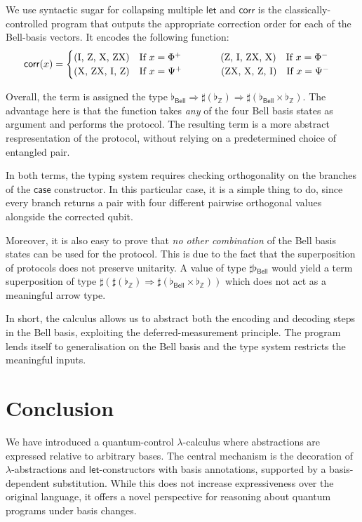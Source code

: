 \documentclass[a4paper,UKenglish,numberwithinsect,pdfa,anonymous]{lipics-v2021}
\theoremstyle{restatestyle}
\def\Arr{\Rightarrow}
\newcommand\B{\mathbb Z}
\newcommand{\Bell}{\mathsf{Bell}}
\newcommand\basis[1]{\ensuremath{\flat_{#1}}}
\begin{document}
We use syntactic sugar for collapsing multiple $\mathsf{let}$ and $\mathsf{corr}$ is
the classically-controlled program that outputs the appropriate correction order for
each of the Bell-basis vectors. It encodes the following function:
\[
\mathsf{corr}(x) = 
\begin{cases}
($I, Z, X, ZX$)\quad \text{If }x=\Phi^+\qquad\qquad
($Z, I, ZX, X$)\quad \text{If }x=\Phi^-\\
($X, ZX, I, Z$)\quad \text{If }x=\Psi^+\qquad\qquad
($ZX, X, Z, I$)\quad \text{If }x=\Psi^-\\
\end{cases}
\]

Overall, the term is assigned the type $\basis{\Bell}\Arr\sharp(\basis{\B})
\Arr\sharp(\basis{\Bell}\times\basis{\B})$. The advantage here is that the function
takes \emph{any} of the four Bell basis states as argument and performs the
protocol. The resulting term is a more abstract respresentation of the protocol,
without relying on a predetermined choice of entangled pair.

In both terms, the typing system requires checking orthogonality on the branches of
the $\mathsf{case}$ constructor. In this particular case, it is a simple thing to 
do, since every branch returns a pair with four different pairwise orthogonal values
alongside the corrected qubit. 

Moreover, it is also easy to prove that \emph{no other combination} of the Bell 
basis states can be used for the protocol. This is due to the fact that the 
superposition of protocols does not preserve unitarity. A value of type 
$\sharp\basis{\Bell}$ would yield a term superposition of type $\sharp(\sharp 
(\basis{\B})\Arr\sharp (\basis{\Bell}\times\basis{\B}))$ which does not act as a 
meaningful arrow type.

In short, the calculus allows us to abstract both the encoding and decoding
steps in the Bell basis, exploiting the deferred-measurement principle. The program 
lends itself to generalisation on the Bell basis and the type system restricts the meaningful inputs.

\section{Conclusion}\label{sec:conclusion}
We have introduced a quantum-control $\lambda$-calculus where abstractions are expressed relative to arbitrary bases. The central mechanism is the decoration of $\lambda$-abstractions and $\mathsf{let}$-constructors with basis annotations, supported by a basis-dependent substitution. While this does not increase expressiveness over the original language, it offers a novel perspective for reasoning about quantum programs under basis changes. 
\end{document}
